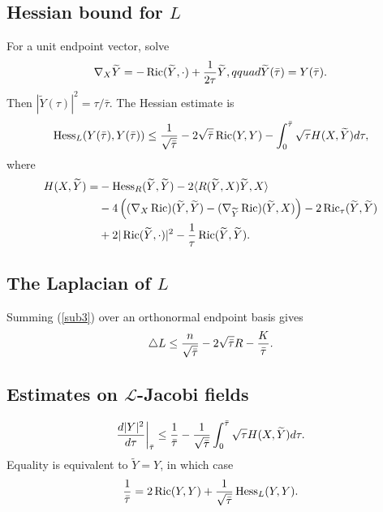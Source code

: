 \subsection{Hessian bound for $L$} \label{7.9}
For a unit endpoint vector, solve
\begin{equation}\label{diffeq}\nabla_X\widetilde Y=-\operatorname{Ric}(\widetilde Y,\cdot)+{1\over2\tau}\widetilde Y,qquad
\widetilde Y(\bar\tau)=Y(\bar\tau).
\end{equation}
Then $|\widetilde Y(\tau)|^2=\tau/\bar\tau$. The Hessian estimate is
\begin{equation}\label{sub3}
\operatorname{Hess}_L(Y(\bar\tau),Y(\bar\tau))\le {1\over\sqrt{\bar\tau}}-2\sqrt{\bar\tau}\operatorname{Ric}(Y,Y)
-\int_0^{\bar\tau}\sqrt\tau H(X,\widetilde Y)d\tau,
\end{equation}
where
\begin{align}\label{Htilde}
H(X,\widetilde Y)=&-\operatorname{Hess}_R(\widetilde Y,\widetilde Y)-2\langle R(\widetilde Y,X)\widetilde Y,X\rangle\\
&-4\left((\nabla_X\operatorname{Ric})(\widetilde Y,\widetilde Y)-(\nabla_{\widetilde Y}\operatorname{Ric})(\widetilde Y,X)\right)-2\operatorname{Ric}_\tau(\widetilde Y,\widetilde Y)\\
&+2|\operatorname{Ric}(\widetilde Y,\cdot)|^2-{1\over\tau}\operatorname{Ric}(\widetilde Y,\widetilde Y).
\end{align}

\subsection{The Laplacian of $L$} \label{7.10}
Summing (\ref{sub3}) over an orthonormal endpoint basis gives
\begin{equation}\label{touse2}
\triangle L\le {n\over\sqrt{\bar\tau}}-2\sqrt{\bar\tau}R-{K\over\bar\tau}.
\end{equation}

\subsection{Estimates on ${\mathcal L}$-Jacobi fields}
\begin{equation}\label{dY}
{d|Y|^2\over d\tau}\bigg|_{\bar\tau}\le {1\over\bar\tau}-{1\over\sqrt{\bar\tau}}\int_0^{\bar\tau}\sqrt\tau H(X,\widetilde Y)d\tau.
\end{equation}
Equality is equivalent to $\widetilde Y=Y$, in which case
\begin{equation}\label{sharp}{1\over\bar\tau}=2\operatorname{Ric}(Y,Y)+{1\over\sqrt{\bar\tau}}\operatorname{Hess}_L(Y,Y).
\end{equation}

